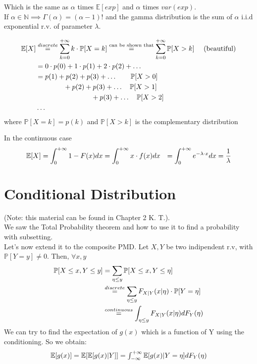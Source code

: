 Which is the same as $\alpha$ times $\mathbb{E}[exp]$ and $\alpha$ times $var(exp)$.
\\ If $\alpha \in \mathbb{N} \implies \Gamma(\alpha) = (\alpha-1)!$ and the gamma
distribution is the sum of $\alpha$ i.i.d exponential r.v. of parameter $\lambda$.

\begin{equation} $$
  \begin{split}
  \mathbb{E}[X]&\stackrel{discrete}{=} \sum\limits_{k=0}^{+\infty} k \cdot \mathbb{P}[X=k]
  \stackrel{\text{can be shown  that}}{=} \sum\limits_{k=0}^{+\infty} \mathbb{P}[X>k] \quad\mbox{  (beautiful)}\\
  &=0 \cdot p(0) + 1 \cdot p(1) + 2 \cdot p(2) + \dots \\
  &= p(1) + p(2) + p(3)+ \dots \qquad \mathbb{P}[X>0]\\
  & \qquad \qquad + p(2) + p(3) +\dots \quad \mathbb{P}[X>1]\\
  & \qquad \qquad \qquad \qquad + p(3)+ \dots \quad \mathbb{P}[X>2] \\
  & \dots
  \end{split}$$
\end{equation}
where $\mathbb{P}[X=k]=p(k)$ and $\mathbb{P}[X>k]$ is the complementary distribution

In the continuous case
\begin{equation}$$
  \begin{split}
    \mathbb{E}[X] &= \int_{0}^{+\infty} 1-F(x) dx = \int_{0}^{+\infty} x \cdot f(x) dx
    &=\int_{0}^{+\infty} e^{-\lambda \cdot x} dx = \frac{1}{\lambda}
  \end{split}$$
\end{equation}

\section{Conditional Distribution}
(Note: this material can be found in Chapter 2 K. T.).\\
We saw the Total Probability theorem and how to use it to find a probability with subsetting.\\
Let's now extend it to the composite PMD. Let $X,Y$ be two indipendent r.v, with $\mathbb{P}[Y=y]\neq 0$.
Then, $\forall x,y$
\begin{equation}$$
  \begin{split}
    \mathbb{P}[X\le x, Y \le y] &= \sum \limits_{\eta \le y} \mathbb{P}[X \le x , Y \le \eta] \\
    &\stackrel{discrete}{=} \sum \limits_{\eta \le y} F_{X|Y}(x | \eta) \cdot \mathbb{P}[Y=\eta]\\
    &\stackrel{continuous}{=} \int_{\eta \le y} F_{X|Y}(x|\eta) dF_Y(\eta)
  \end{split}$$
\end{equation}
We can try to find the expectation of $g(x)$ which is a function of Y using the conditioning. So we obtain:
\begin{equation}
  $$\mathbb{E}[g(x)]=\mathbb{E}[\mathbb{E}[g(x)|Y]] = \int_{-\infty}^{+\infty}\mathbb{E}[g(x)|Y=\eta] dF_Y(\eta)$$
\end{equation}

